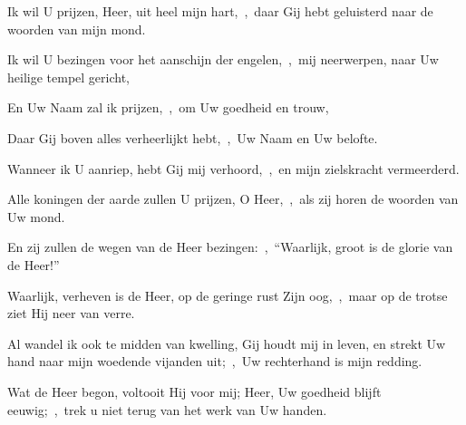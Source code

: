 \documentclass[12pt,twoside,a5paper]{article}
\begin{document}

\begin{halfparskip}
  Ik wil U prijzen, Heer, uit heel mijn hart,~\sep\ daar Gij hebt geluisterd naar de woorden van mijn mond.


  Ik wil U bezingen voor het aanschijn der engelen,~\sep\ mij neerwerpen, naar Uw heilige tempel gericht,

  En Uw Naam zal ik prijzen,~\sep\ om Uw goedheid en trouw,

  Daar Gij boven alles verheerlijkt hebt,~\sep\ Uw Naam en Uw belofte.

  Wanneer ik U aanriep, hebt Gij mij verhoord,~\sep\ en mijn zielskracht vermeerderd.

  Alle koningen der aarde zullen U prijzen, O Heer,~\sep\ als zij horen de woorden van Uw mond.

  En zij zullen de wegen van de Heer bezingen:~\sep\ ``Waarlijk, groot is de glorie van de Heer!''

  Waarlijk, verheven is de Heer, op de geringe rust Zijn oog,~\sep\ maar op de trotse ziet Hij neer van verre.

  Al wandel ik ook te midden van kwelling, Gij houdt mij in leven, en strekt Uw hand naar mijn woedende vijanden uit;~\sep\ Uw rechterhand is mijn redding.

  Wat de Heer begon, voltooit Hij voor mij; Heer, Uw goedheid blijft eeuwig;~\sep\ trek u niet terug van het werk van Uw handen.
\end{halfparskip}



\end{document}
